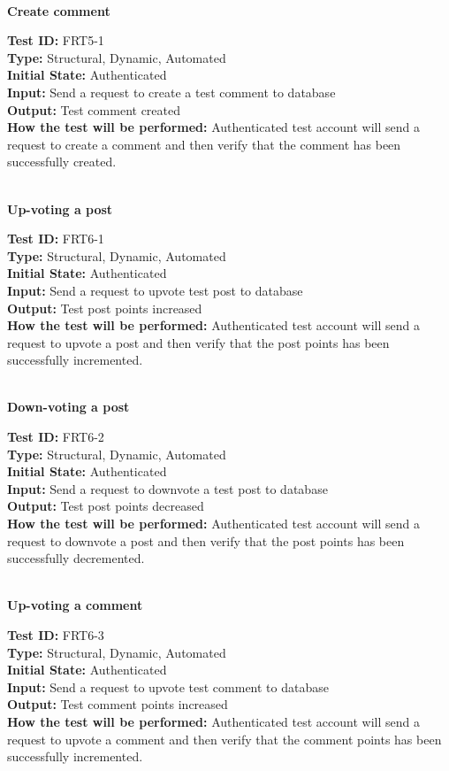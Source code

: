 \documentclass[12pt,fleqn]{article}
\begin{document}
\textbf{\\Create comment}
\begin{tcolorbox}
\textbf{Test ID:} FRT5-1\\
\textbf{Type:} Structural, Dynamic, Automated\\
\textbf{Initial State:} Authenticated\\
\textbf{Input:} Send a request to create a test comment to database\\
\textbf{Output:} Test comment created\\
\textbf{How the test will be performed:} Authenticated test account will send a request to create a comment and then verify that the comment has been successfully created.
\end{tcolorbox}

\newpage

\textbf{\\Up-voting a post}
\begin{tcolorbox}
\textbf{Test ID:} FRT6-1\\
\textbf{Type:} Structural, Dynamic, Automated\\
\textbf{Initial State:} Authenticated\\
\textbf{Input:} Send a request to upvote test post to database\\
\textbf{Output:} Test post points increased\\
\textbf{How the test will be performed:} Authenticated test account will send a request to upvote a post and then verify that the post points has been successfully incremented.
\end{tcolorbox}

\textbf{\\Down-voting a post}
\begin{tcolorbox}
\textbf{Test ID:} FRT6-2\\
\textbf{Type:} Structural, Dynamic, Automated\\
\textbf{Initial State:} Authenticated\\
\textbf{Input:} Send a request to downvote a test post to database\\
\textbf{Output:} Test post points decreased\\
\textbf{How the test will be performed:} Authenticated test account will send a request to downvote a post and then verify that the post points has been successfully decremented.
\end{tcolorbox}

\textbf{\\Up-voting a comment}
\begin{tcolorbox}
\textbf{Test ID:} FRT6-3\\
\textbf{Type:} Structural, Dynamic, Automated\\
\textbf{Initial State:} Authenticated\\
\textbf{Input:} Send a request to upvote test comment to database\\
\textbf{Output:} Test comment points increased\\
\textbf{How the test will be performed:} Authenticated test account will send a request to upvote a comment and then verify that the comment points has been successfully incremented.
\end{tcolorbox}
\end{document}
